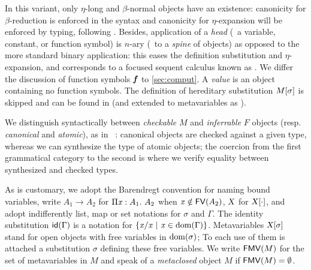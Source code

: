 \documentclass{llncs}
\begin{document}
In this variant, only $\eta$-long and $\beta$-normal objects have an
existence: canonicity for $\beta$-reduction is enforced in the syntax
and canonicity for $\eta$-expansion will be enforced by typing,
following \cite{hl07mechanizing}. Besides, application of a
\emph{head} (\ie\ a variable, constant, or function symbol) is $n$-ary
(\ie\ to a \emph{spine} of objects) as opposed to the more standard
binary application: this eases the definition substitution and
$\eta$-expansion, and corresponds to a focused sequent calculus known
as  \cite{herbelin1995lambda}. We differ the discussion of
function symbols $\text{\textit{\textbf{f}}}$ to \ref{sec:comput}. A \emph{value} is an
object containing no function symbols. The definition of hereditary
substitution ${M}[{\sigma}]$ is skipped and can be found in
\cite{pfenning2007term} (and extended to metavariables as
\cite{nanevski2008contextual}).

We distinguish syntactically between \emph{checkable} $M$ and
\emph{inferrable} $F$ objects (resp. \emph{canonical} and
\emph{atomic}), as in \eg\ \cite{pierce2000local}: canonical objects
are checked against a given type, whereas we can synthesize the type
of atomic objects; the coercion from the first grammatical category to
the second is where we verify equality between synthesized and checked
types.

As is customary, we adopt the Barendregt convention for naming bound
variables, write $A_1\to A_2$ for $\Pi{\ensuremath{\text{\textit{x}}}}:{A_1}.\  {A_2}$ when $\text{\textit{x}}\notin
{\text{\textsf{FV}}}({A_2})$, $\text{\textsl{X}}$ for ${\text{\textsl{X}}}[{\cdot}]$, and adopt indifferently
list, map or set notations for $\sigma$ and $\Gamma$. The identity
substitution ${\text{\textsf{id}}}({\Gamma})$ is a notation for $\{{\text{\textit{x}}}/{\text{\textit{x}}}\ |\ \text{\textit{x}} \in\operatorname{dom}{\!(\Gamma)}\}$. Metavariables ${\text{\textsl{X}}}[{\sigma}]$
stand for open objects with free variables in $\operatorname{dom}{\!(\sigma)}$; To each
use of them is attached a substitution $\sigma$ defining these free
variables. We write ${\text{\textsf{FMV}}}({M})$ for the set of metavariables in $M$ and
speak of a \emph{metaclosed} object $M$ if ${\text{\textsf{FMV}}}({M}) = \emptyset$.


\end{document}

